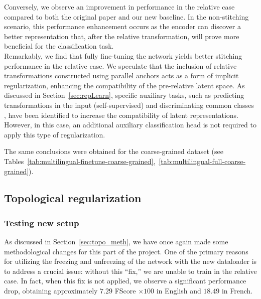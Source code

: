 \documentclass[../main.tex]{subfiles}
\begin{document}
Conversely, we observe an improvement in performance in the relative case compared to both the original paper and our new baseline. In the non-stitching scenario, this performance enhancement occurs as the encoder can discover a better representation that, after the relative transformation, will prove more beneficial for the classification task.\\

Remarkably, we find that fully fine-tuning the network yields better stitching performance in the relative case. We speculate that the inclusion of relative transformations constructed using parallel anchors acts as a form of implicit regularization, enhancing the compatibility of the pre-relative latent space. As discussed in Section~\ref{sec:repLearn}, specific auxiliary tasks, such as predicting transformations in the input (self-supervised) and discriminating common classes \cite{gygli_towards_2020}, have been identified to increase the compatibility of latent representations. However, in this case, an additional auxiliary classification head is not required to apply this type of regularization.

\begin{mathNote}
The same conclusions were obtained for the coarse-grained dataset (see Tables~\ref{tab:multilingual-finetune-coarse-grained},~\ref{tab:multilingual-full-coarse-grained}).
\end{mathNote}

\subsection{Topological regularization}
\subsubsection*{Testing new setup}

As discussed in Section~\ref{sec:topo_meth}, we have once again made some methodological changes for this part of the project. One of the primary reasons for utilizing the freezing and unfreezing of the network with the new dataloader is to address a crucial issue: without this ``fix,'' we are unable to train in the relative case. In fact, when this fix is not applied, we observe a significant performance drop, obtaining approximately $7.29$ FScore $\times 100$ in English and $18.49$ in French.\\
\end{document}
